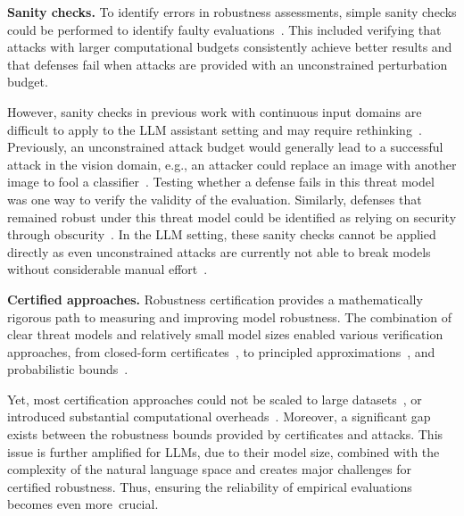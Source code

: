 \textbf{Sanity checks.} To identify errors in robustness assessments, simple sanity checks could be performed to identify faulty evaluations~\cite{uesato2018adversarial, carlini_evaluating_2019}. This included verifying that attacks with larger computational budgets consistently achieve better results and that defenses fail when attacks are provided with an unconstrained perturbation budget.

However, sanity checks in previous work with continuous input domains are difficult to apply to the LLM assistant setting and may require rethinking~\citep{athalye_obfuscated_2018, carlini_evaluating_2019, tramer_adaptive_2020}. Previously, an unconstrained attack budget would generally lead to a successful attack in the vision domain, e.g., an attacker could replace an image with another image to fool a classifier~\cite{carlini_evaluating_2019}. Testing whether a defense fails in this threat model was one way to verify the validity of the evaluation. Similarly, defenses that remained robust under this threat model could be identified as relying on security through obscurity~\citep{athalye_obfuscated_2018}. In the LLM setting, these sanity checks cannot be applied directly as even unconstrained attacks are currently not able to break models without considerable manual effort~\cite{li2024llm}.

\textbf{Certified approaches.} Robustness certification provides a mathematically rigorous path to measuring and improving model robustness. The combination of clear threat models and relatively small model sizes enabled various verification approaches, from closed-form certificates~\cite{tjeng2017evaluating}, to principled approximations~\cite{gowal2018effectiveness}, and probabilistic bounds~\cite{cohen2019certified}. 

Yet, most certification approaches could not be scaled to large datasets~\cite{tjeng2017evaluating}, or introduced substantial computational overheads~\cite{cohen2019certified}. Moreover, a significant gap exists between the robustness bounds provided by certificates and attacks.
This issue is further amplified for LLMs, due to their model size, combined with the complexity of the natural language space and creates major challenges for certified robustness. Thus, ensuring the reliability of empirical evaluations becomes even more~crucial. 
\vspace{-15pt}
